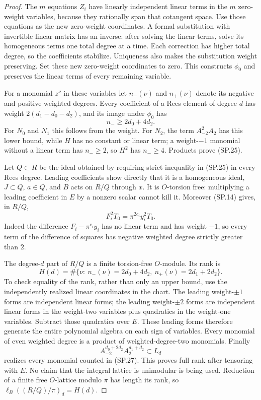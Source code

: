 \begin{proof}
The $m$ equations $Z_i$ have linearly independent linear terms in
the $m$ zero-weight variables, because they rationally span that
cotangent space.  Use those equations as the new zero-weight
coordinates.  A formal substitution with invertible linear matrix
has an inverse: after solving the linear terms, solve its
homogeneous terms one total degree at a time.  Each correction has
higher total degree, so the coefficients stabilize.  Uniqueness
also makes the substitution weight preserving.  Set these new
zero-weight coordinates to zero.  This constructs $\phi_0$ and
preserves the linear terms of every remaining variable.

For a monomial $z^\nu$ in these variables let $n_-(\nu)$ and
$n_+(\nu)$ denote its negative and positive weighted degrees.
Every coefficient of a Rees element of degree $d$ has weight
$2(d_1-d_0-d_2)$, and its image under $\phi_0$ has
\[
                    n_-\ge 2d_0+4d_2.
 \tag{SP.25}
\]
For $N_0$ and $N_1$ this follows from the weight.  For $N_2$, the
term $A_{-2}^2A_2$ has this lower bound, while $H$ has no constant
or linear term; a weight-$-1$ monomial without a linear term has
$n_-\ge2$, so $H^2$ has $n_-\ge4$.  Products prove (SP.25).

Let $Q\subset R$ be the ideal obtained by requiring strict inequality
in (SP.25) in every Rees degree.  Leading coefficients show directly
that it is a homogeneous ideal, $J\subset Q$, $a\in Q$, and
$B$ acts on $R/Q$ through $x$.  It is $O$-torsion free: multiplying
a leading coefficient in $E$ by a nonzero scalar cannot kill it.
Moreover (SP.14) gives, in $R/Q$,
\[
                      F_i^2T_0=\pi^{2c_i}y_i^2T_0.
 \tag{SP.26}
\]
Indeed the difference $F_i-\pi^{c_i}y_i$ has no linear term and
has weight $-1$, so every term of the difference of squares has
negative weighted degree strictly greater than $2$.

The degree-$d$ part of $R/Q$ is a finite torsion-free $O$-module.
Its rank is
\[
 H(d)=\#\{\nu:\ n_-(\nu)=2d_0+4d_2,
                       \ n_+(\nu)=2d_1+2d_2\}.
 \tag{SP.27}
\]
To check equality of the rank, rather than only an upper bound,
use the independently realized linear coordinates in the chart.
The leading weight-$\pm1$ forms are independent linear forms; the
leading weight-$\pm2$ forms are independent linear forms in the
weight-two variables plus quadratics in the weight-one variables.
Subtract those quadratics over $E$.  These leading forms therefore
generate the entire polynomial algebra on each sign of variables.
Every monomial of even weighted degree is a product of
weighted-degree-two monomials.  Finally
\[
             A_{-2}^{d_0+2d_2}A_2^{d_1+d_2}\subset L_d
\]
realizes every monomial counted in (SP.27).  This proves full rank
after tensoring with $E$.  No claim that the integral lattice is
unimodular is being used.  Reduction of a finite free $O$-lattice
modulo $\pi$ has length its rank, so
$\ell_B((R/Q)/\pi)_d=H(d)$.


\end{proof}
